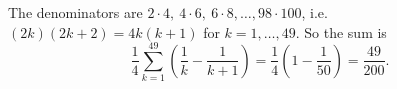 The denominators are $2\cdot4,\ 4\cdot6,\ 6\cdot8,\dots,98\cdot100$, i.e. $(2k)(2k+2)=4k(k+1)$ for $k=1,\dots,49$. So the sum is
\[\dfrac{1}{4}\sum_{k=1}^{49}\left(\dfrac{1}{k}-\dfrac{1}{k+1}\right)=\dfrac{1}{4}\left(1-\dfrac{1}{50}\right)=\boxed{\dfrac{49}{200}}.\]
